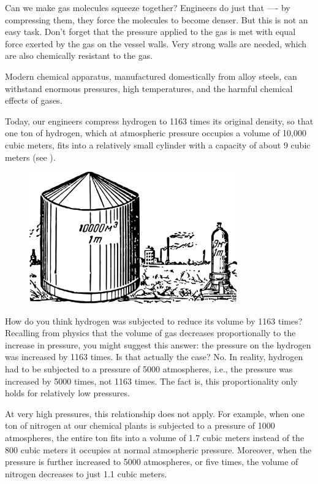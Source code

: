 Can we make gas molecules squeeze together? Engineers do just that —- by compressing them, they force the molecules to become denser. But this is not an easy task. Don't forget that the pressure applied to the gas is met with equal force exerted by the gas on the vessel walls. Very strong walls are needed, which are also chemically resistant to the gas.

Modern chemical apparatus, manufactured domestically from alloy steels, can withstand enormous pressures, high temperatures, and the harmful chemical effects of gases.

Today, our engineers compress hydrogen to 1163 times its original density, so that one ton of hydrogen, which at atmospheric pressure occupies a volume of 10,000 cubic meters, fits into a relatively small cylinder with a capacity of about 9 cubic meters (see ).


\begin{figure}[h!]
\centering
\includegraphics[width=0.8\textwidth]{figures/ch-11/fig-162.pdf}
\end{figure}


How do you think hydrogen was subjected to reduce its volume by 1163 times? Recalling from physics that the volume of gas decreases proportionally to the increase in pressure, you might suggest this answer: the pressure on the hydrogen was increased by 1163 times. Is that actually the case? No. In reality, hydrogen had to be subjected to a pressure of 5000 atmospheres, i.e., the pressure was increased by 5000 times, not 1163 times. The fact is, this proportionality only holds for relatively low pressures.

At very high pressures, this relationship does not apply. For example, when one ton of nitrogen at our chemical plants is subjected to a pressure of 1000 atmospheres, the entire ton fits into a volume of 1.7 cubic meters instead of the 800 cubic meters it occupies at normal atmospheric pressure. Moreover, when the pressure is further increased to 5000 atmospheres, or five times, the volume of nitrogen decreases to just 1.1 cubic meters.



